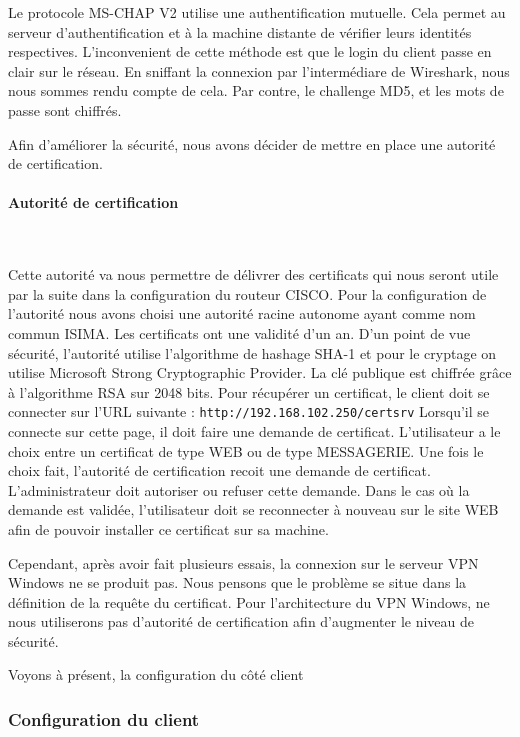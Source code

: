 Le protocole MS-CHAP V2 utilise une authentification mutuelle. Cela permet au serveur d'authentification et à la machine distante de vérifier leurs identités respectives. L'inconvenient de cette méthode est que le login du client passe en clair sur le réseau. En sniffant la connexion par l'intermédiare de Wireshark, nous nous sommes rendu compte de cela. Par contre, le challenge MD5, et les mots de passe sont chiffrés.



Afin d'améliorer la sécurité, nous avons décider de mettre en place une autorité de certification.

\paragraph{Autorité de certification}
~


Cette autorité va nous permettre de délivrer des certificats qui nous seront utile par la suite dans la configuration du routeur CISCO. Pour la configuration de l'autorité nous avons choisi une autorité racine autonome ayant comme nom commun ISIMA. Les certificats ont une validité d'un an. D'un point de vue sécurité, l'autorité utilise l'algorithme de hashage SHA-1 et pour le cryptage on utilise Microsoft Strong Cryptographic Provider. La clé publique est chiffrée grâce à l'algorithme RSA sur 2048 bits.
Pour récupérer un certificat, le client doit se connecter sur l'URL suivante : \verb|http://192.168.102.250/certsrv|
Lorsqu'il se connecte sur cette page, il doit faire une demande de certificat. L'utilisateur a le choix entre un certificat de type WEB ou de type MESSAGERIE. Une fois le choix fait, l'autorité de certification recoit une demande de certificat. L'administrateur doit autoriser ou refuser cette demande. Dans le cas où la demande est validée, l'utilisateur doit se reconnecter à nouveau sur le site WEB afin de pouvoir installer ce certificat sur sa machine.

Cependant, après avoir fait plusieurs essais, la connexion sur le serveur VPN Windows ne se produit pas. Nous pensons que le problème se situe dans la définition de la requête du certificat. Pour l'architecture du VPN Windows, ne nous utiliserons pas d'autorité de certification afin d'augmenter le niveau de sécurité. 

Voyons à présent, la configuration du côté client

\subsubsection{Configuration du client}
~

